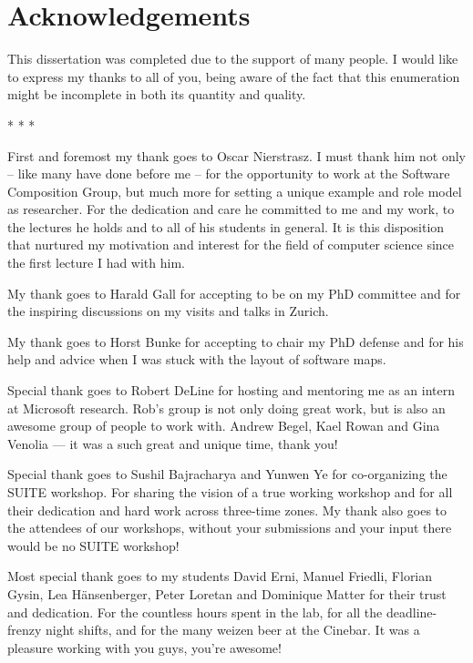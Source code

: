 \chapter*{Acknowledgements}

This dissertation was completed due to the support of many people.
I would like to express my thanks to all of you, being aware of the fact that this enumeration might be incomplete in both its quantity and quality.

\begin{center}* * *\end{center}

First and foremost my thank goes to Oscar Nierstrasz. 
%
I must thank him not only -- like many have done before me -- for the opportunity to work at the Software Composition Group, but much more for setting a unique example and role model as researcher. For the dedication and care he committed to me and my 
work, to the lectures he holds and to all of his students in general. It is this disposition that 
nurtured my motivation and interest for the field of computer science since the first lecture 
I had with him. 

My thank goes to Harald Gall for accepting to be on my PhD committee and for the inspiring discussions on my visits and talks in Zurich. 

My thank goes to Horst Bunke for accepting to chair my PhD defense and for his help and advice when I was stuck with the layout of software maps.

Special thank goes to Robert DeLine for hosting and mentoring me as an intern at Microsoft research. Rob's group is not only doing great work, but is also an awesome group of people to work with. Andrew Begel, Kael Rowan and Gina Venolia --- it was a such great and unique time, thank you!

Special thank goes to Sushil Bajracharya and Yunwen Ye for co-organizing the SUITE workshop. For sharing the vision of a true working workshop and for all their dedication and hard work across three-time zones. My thank also goes to the attendees of our workshops, without your submissions and your input there would be no SUITE workshop!

Most special thank goes to my students David Erni, Manuel Friedli, Florian Gysin, Lea H\"ansenberger, Peter Loretan and Dominique Matter for their trust and dedication. For the countless hours spent in the lab, for all the deadline-frenzy night shifts, and for the many weizen beer at the Cinebar. It was a pleasure working with you guys, you're awesome!

